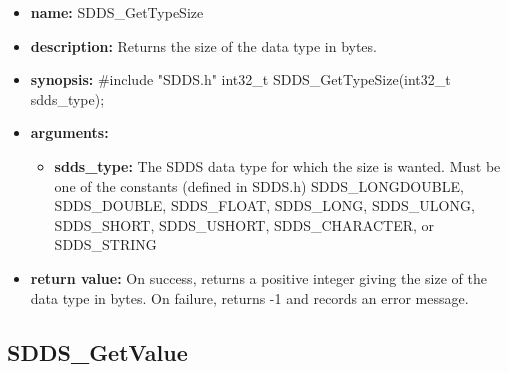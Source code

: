 \documentclass[11pt]{article}
\begin{document}
\begin{itemize}
\item {\bf name:}\newline
SDDS\_GetTypeSize
\item {\bf description:}\newline
Returns the size of the data type in bytes.
\item {\bf synopsis:} \#include "SDDS.h"\newline
int32\_t SDDS\_GetTypeSize(int32\_t sdds\_type);
\item {\bf arguments:}
\begin{itemize}
\item {\bf sdds\_type:} The SDDS data type for which the size is wanted. Must be one of the constants (defined in SDDS.h) SDDS\_LONGDOUBLE, SDDS\_DOUBLE, SDDS\_FLOAT, SDDS\_LONG, SDDS\_ULONG, SDDS\_SHORT, SDDS\_USHORT, SDDS\_CHARACTER, or SDDS\_STRING
\end{itemize}
\item {\bf return value:}\newline
On success, returns a positive integer giving the size of the data type in bytes. On failure, returns -1 and records an error message. 
\end{itemize}

\subsection{SDDS\_GetValue}
\label{SDDS_GetValue}
\end{document}
